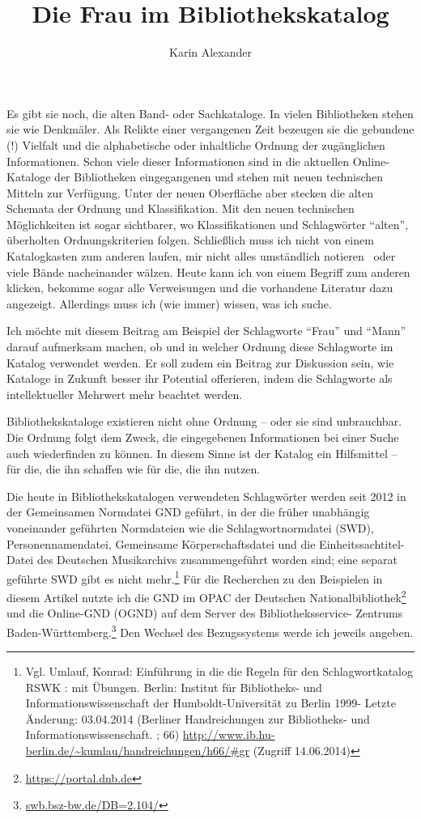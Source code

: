 \documentclass[a4paper,
fontsize=11pt,
oneside,
numbers=noperiodatend,
parskip=half-,
bibliography=totoc,
final
]{scrartcl}
\title{\LARGE{Die Frau im Bibliothekskatalog}} %
\author{Karin Alexander} %
\date{}
\begin{document}
\maketitle
\thispagestyle{fancyplain} 


Es gibt sie noch, die alten Band- oder Sachkataloge. In vielen
Bibliotheken stehen sie wie Denkmäler. Als Relikte einer vergangenen
Zeit bezeugen sie die gebundene (!) Vielfalt und die alphabetische oder
inhaltliche Ordnung der zugänglichen Informationen. Schon viele dieser
Informationen sind in die aktuellen Online-Kataloge der Bibliotheken
eingegangenen und stehen mit neuen technischen Mitteln zur Verfügung.
Unter der neuen Oberfläche aber stecken die alten Schemata der Ordnung
und Klassifikation. Mit den neuen technischen Möglichkeiten ist sogar
sichtbarer, wo Klassifikationen und Schlagwörter \enquote{alten},
überholten Ordnungskriterien folgen. Schließlich muss ich nicht von
einem Katalogkasten zum anderen laufen, mir nicht alles umständlich
notieren~ oder viele Bände nacheinander wälzen. Heute kann ich von einem
Begriff zum anderen klicken, bekomme sogar alle Verweisungen und die
vorhandene Literatur dazu angezeigt. Allerdings muss ich (wie immer)
wissen, was ich suche.~

Ich möchte mit diesem Beitrag am Beispiel der Schlagworte \enquote{Frau}
und \enquote{Mann} darauf aufmerksam machen, ob und in welcher Ordnung
diese Schlagworte im Katalog verwendet werden. Er soll zudem ein Beitrag
zur Diskussion sein, wie Kataloge in Zukunft besser ihr Potential
offerieren, indem die Schlagworte als intellektueller Mehrwert mehr
beachtet werden.

Bibliothekskataloge existieren nicht ohne Ordnung -- oder sie sind
unbrauchbar. Die Ordnung folgt dem Zweck, die eingegebenen Informationen
bei einer Suche auch wiederfinden zu können. In diesem Sinne ist der
Katalog ein Hilfsmittel -- für die, die ihn schaffen wie für die, die
ihn nutzen.

Die heute in Bibliothekskatalogen verwendeten Schlagwörter werden seit
2012 in der Gemeinsamen Normdatei GND geführt, in der die früher
unabhängig voneinander geführten Normdateien wie die Schlagwortnormdatei
(SWD), Personennamendatei, Gemeinsame Körperschaftsdatei und die
Einheitssachtitel-Datei des Deutschen Musikarchivs zusammengeführt
worden sind; eine separat geführte SWD gibt es nicht mehr.\footnote{Vgl.
  Umlauf, Konrad: Einführung in die die Regeln für den Schlagwortkatalog
  RSWK : mit Übungen. Berlin: Institut für Bibliotheks- und
  Informationswissenschaft der Humboldt-Universität zu Berlin 1999-
  Letzte Änderung: 03.04.2014 (Berliner Handreichungen zur Bibliotheks-
  und Informationswissenschaft. ; 66)
  \href{http://www.ib.hu-berlin.de/~kumlau/handreichungen/h66/xgr}{http://www.ib.hu-berlin.de/\textasciitilde{}kumlau/handreichungen/h66/\#gr}
  (Zugriff 14.06.2014)} Für die Recherchen zu den Beispielen in diesem
Artikel nutzte ich die GND im OPAC der Deutschen
Nationalbibliothek\footnote{\url{https://portal.dnb.de}} und die
Online-GND (OGND) auf dem Server des Bibliotheksservice- Zentrums
Baden-Württemberg.\footnote{\url{swb.bsz-bw.de/DB=2.104/}} Den Wechsel
des Bezugssystems werde ich jeweils angeben.
\end{document}

